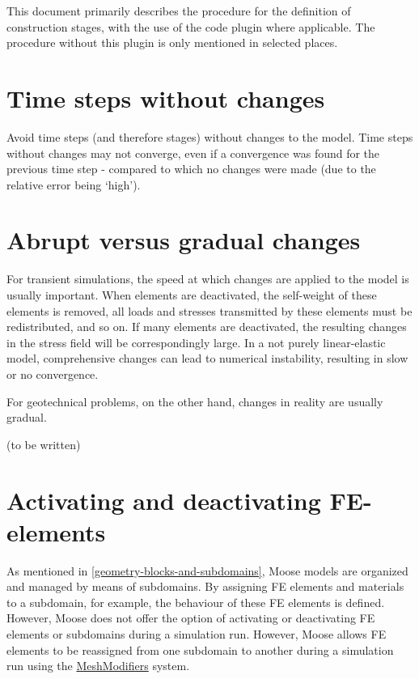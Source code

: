 This document primarily describes the procedure for the definition of
construction stages, with the use of the \codeword{[Stages]} code plugin where
applicable. The procedure without this plugin is only mentioned in selected
places.

\section{Time steps without changes}
\label{chap:stages-without-changes}

Avoid time steps (and therefore stages) without changes to the model. Time
steps without changes may not converge, even if a convergence was found for the
previous time step - compared to which no changes were made (due to the
relative error being ‘high’).


\section{Abrupt versus gradual changes}
\label{chap:stages-gradual-changes}

For transient simulations, the speed at which changes are applied to the model
is usually important. When elements are deactivated, the self-weight of these
elements is removed, all loads and stresses transmitted by these elements must
be redistributed, and so on. If many elements are deactivated, the resulting
changes in the stress field will be correspondingly large. In a not purely
linear-elastic model, comprehensive changes can lead to numerical instability,
resulting in slow or no convergence.

For geotechnical problems, on the other hand, changes in reality are usually
gradual.

(to be written)

\section{Activating and deactivating FE-elements}
\label{chap:stages-element-activation-deactivation}


As mentioned in \autoref{geometry-blocks-and-subdomains}, Moose models are
organized and managed by means of subdomains. By assigning FE elements and
materials to a subdomain, for example, the behaviour of these FE elements is
defined. However, Moose does not offer the option of activating or deactivating
FE elements or subdomains during a simulation run. However, Moose allows FE
elements to be reassigned from one subdomain to another during a simulation run
using the
\href{https://mooseframework.inl.gov/syntax/MeshModifiers/index.html}{MeshModifiers}
system.

